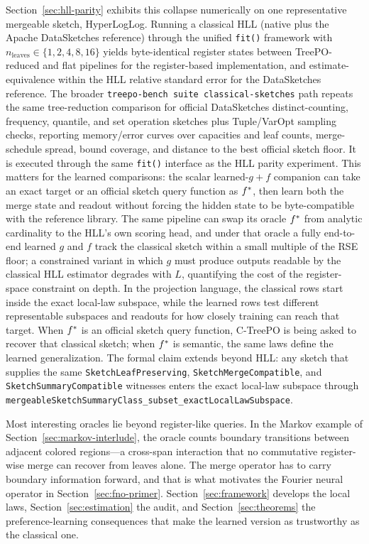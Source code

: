 Section~\ref{sec:hll-parity} exhibits this collapse numerically on one
representative mergeable sketch, HyperLogLog. Running a classical HLL
(native plus the Apache DataSketches reference) through the unified
\texttt{fit()} framework with $n_{\mathrm{leaves}} \in \{1, 2, 4, 8,
16\}$ yields byte-identical register states between TreePO-reduced and
flat pipelines for the register-based implementation, and
estimate-equivalence within the HLL relative standard error for the
DataSketches reference. The broader \texttt{treepo-bench suite
classical-sketches} path repeats the same tree-reduction comparison for
official DataSketches distinct-counting, frequency, quantile, and set
operation sketches plus Tuple/VarOpt sampling checks, reporting
memory/error curves over capacities and leaf counts, merge-schedule
spread, bound coverage, and distance to the best official sketch floor.
It is executed through the same \texttt{fit()} interface as the HLL
parity experiment. This matters for the learned comparisons: the scalar
learned-\(g{+}f\) companion can take an exact target or an official sketch
query function as \(f^\ast\), then learn both the merge state and readout
without forcing the hidden state to be byte-compatible with the reference
library.
The same
pipeline can swap its oracle $f^\ast$ from analytic cardinality to the
HLL's own scoring head, and under that oracle a fully end-to-end learned
$g$ and $f$ track the classical sketch within a small multiple of the RSE
floor; a constrained variant in which $g$ must produce outputs readable by
the classical HLL estimator degrades with $L$, quantifying the cost of the
register-space constraint on depth. In the projection language, the
classical rows start inside the exact local-law subspace, while the
learned rows test different representable subspaces and readouts for how
closely training can reach that target. When $f^\ast$ is an official
sketch query function, C-TreePO is being asked to recover that classical
sketch; when $f^\ast$ is semantic, the same laws define the learned
generalization. The formal claim extends beyond HLL: any sketch that supplies the
same \texttt{SketchLeafPreserving}, \texttt{SketchMergeCompatible}, and
\texttt{SketchSummaryCompatible} witnesses enters the exact local-law
subspace through
\texttt{mergeableSketchSummaryClass\_subset\_exactLocalLawSubspace}.

Most interesting oracles lie beyond register-like queries. In the Markov example of Section~\ref{sec:markov-interlude}, the oracle counts boundary transitions between adjacent colored regions---a cross-span interaction that no commutative register-wise merge can recover from leaves alone. The merge operator has to carry boundary information forward, and that is what motivates the Fourier neural operator in Section~\ref{sec:fno-primer}. Section~\ref{sec:framework} develops the local laws, Section~\ref{sec:estimation} the audit, and Section~\ref{sec:theorems} the preference-learning consequences that make the learned version as trustworthy as the classical one.
